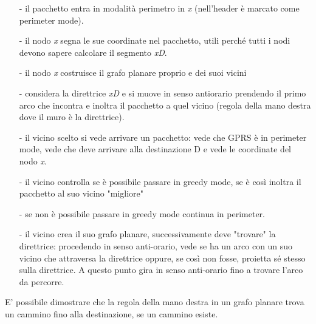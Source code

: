 \documentclass[12pt,italian]{report}
\begin{document}
\begin{itemize}
    \item [-] il pacchetto entra in modalità perimetro in \textit{x} (nell'header è marcato come perimeter mode).
    \item [-] il nodo \textit{x} segna le sue coordinate nel pacchetto, utili perché tutti i nodi devono sapere calcolare il segmento \textit{xD}.
    \item [-] il nodo \textit{x} costruisce il grafo planare proprio e dei suoi vicini 
    \item [-] considera la direttrice \textit{xD} e si muove in senso antiorario prendendo il primo arco che incontra e inoltra il pacchetto a quel vicino (regola della mano destra dove il muro è la direttrice).
    \item [-] il vicino scelto si vede arrivare un pacchetto: vede che GPRS è in perimeter mode, vede che deve arrivare alla destinazione D e vede le coordinate del nodo \textit{x}.
    \item [-] il vicino controlla se è possibile passare in greedy mode, se è così inoltra il pacchetto al suo vicino "migliore"
    \item [-] se non è possibile passare in greedy mode continua in perimeter.
    \item [-] il vicino crea il suo grafo planare, successivamente deve "trovare" la direttrice: procedendo in senso anti-orario, vede se ha un arco con un suo vicino che attraversa la direttrice oppure, se così non fosse, proietta sé stesso sulla direttrice. A questo punto gira in senso anti-orario fino a trovare l'arco da percorre.
\end{itemize}
E' possibile dimostrare che la regola della mano destra in un grafo planare trova un cammino fino alla destinazione, se un cammino esiste. 
\end{document}
